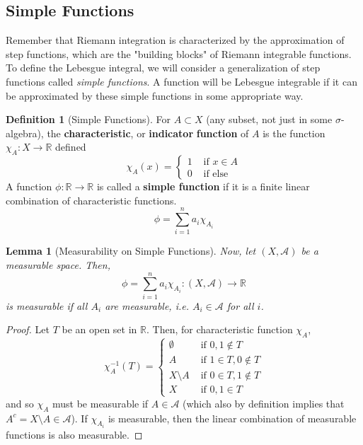 \documentclass{article}
\newtheorem{lemma}[theorem]{Lemma}
\theoremstyle{remark}
\theoremstyle{definition}
\newtheorem{definition}{Definition}[section]
\begin{document}
\subsection{Simple Functions}

Remember that Riemann integration is characterized by the approximation of step functions, which are the "building blocks" of Riemann integrable functions. To define the Lebesgue integral, we will consider a generalization of step functions called \textit{simple functions}. A function will be Lebesgue integrable if it can be approximated by these simple functions in some appropriate way. 

\begin{definition}[Simple Functions]
For $A \subset X$ (any subset, not just in some $\sigma$-algebra), the \textbf{characteristic}, or \textbf{indicator} \textbf{function} of $A$ is the function $\chi_A : X \longrightarrow \mathbb{R}$ defined 
\[\chi_A (x) = \begin{cases} 1 & \text{ if } x \in A \\ 0 & \text{ if else} \end{cases}\]
A function $\phi: \mathbb{R} \longrightarrow \mathbb{R}$ is called a \textbf{simple function} if it is a finite linear combination of characteristic functions. 
\[\phi = \sum_{i=1}^n a_i \chi_{A_i}\]
\end{definition}

\begin{lemma}[Measurability on Simple Functions]
Now, let $(X, \mathcal{A})$ be a measurable space. Then, 
\[\phi = \sum_{i=1}^n a_i \chi_{A_i} : (X, \mathcal{A}) \longrightarrow \mathbb{R}\]
is measurable if all $A_i$ are measurable, i.e. $A_i \in \mathcal{A}$ for all $i$. 
\end{lemma}
\begin{proof}
Let $T$ be an open set in $\mathbb{R}$. Then, for characteristic function $\chi_A$, 
\[\chi_A^{-1} (T) = \begin{cases} 
\emptyset & \text{ if } 0, 1 \not\in T \\
A & \text{ if } 1 \in T, 0 \not\in T \\
X \setminus A & \text{ if } 0 \in T, 1 \not\in T \\
X & \text{ if } 0, 1 \in T
\end{cases}\]
and so $\chi_A$ must be measurable if $A \in \mathcal{A}$ (which also by definition implies that $A^c = X \setminus A \in \mathcal{A}$). If $\chi_{A_i}$ is measurable, then the linear combination of measurable functions is also measurable. 
\end{proof}
\end{document}
